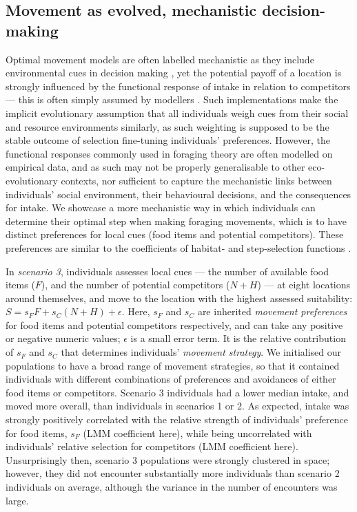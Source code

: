 \subsection*{Movement as evolved, mechanistic decision-making}

Optimal movement models are often labelled mechanistic as they include environmental cues in decision making \citep[e.g.][]{scherer2020}, yet the potential payoff of a location is strongly influenced by the functional response of intake in relation to competitors --- this is often simply assumed by modellers \citep[][]{vandermeer1997}.
Such implementations make the implicit evolutionary assumption that all individuals weigh cues from their social and resource environments similarly, as such weighting is supposed to be the stable outcome of selection fine-tuning individuals' preferences.
However, the functional responses commonly used in foraging theory are often modelled on empirical data, and as such may not be properly generalisable to other eco-evolutionary contexts, nor sufficient to capture the mechanistic links between individuals' social environment, their behavioural decisions, and the consequences for intake.
We showcase a more mechanistic way in which individuals can determine their optimal step when making foraging movements, which is to have distinct preferences for local cues (food items and potential competitors).
These preferences are similar to the coefficients of habitat- and step-selection functions \citep[][; see more below]{fortin2005,avgar2013,avgar2016,fieberg2010}.

In \textit{scenario 3}, individuals assesses local cues --- the number of available food items ($F$), and the number of potential competitors ($N + H$) --- at eight locations around themselves, and move to the location with the highest assessed suitability: $S = s_FF + s_C(N + H) + \epsilon$.
Here, $s_F$ and $s_C$ are inherited \textit{movement preferences} for food items and potential competitors respectively, and can take any positive or negative numeric values; $\epsilon$ is a small error term.
It is the relative contribution of $s_F$ and $s_C$ that determines individuals' \textit{movement strategy}.
We initialised our populations to have a broad range of movement strategies, so that it contained individuals with different combinations of preferences and avoidances of either food items or competitors.
Scenario 3 individuals had a lower median intake, and moved more overall, than individuals in scenarios 1 or 2.
As expected, intake was strongly positively correlated with the relative strength of individuals' preference for food items, $s_F$ (LMM coefficient here), while being uncorrelated with individuals' relative selection for competitors (LMM coefficient here).
Unsurprisingly then, scenario 3 populations were strongly clustered in space; however, they did not encounter substantially more individuals than scenario 2 individuals on average, although the variance in the number of encounters was large.

